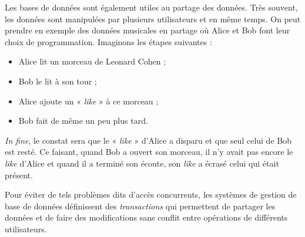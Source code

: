 Les bases de données sont également utiles au partage des données. Très souvent, les données sont manipulées par plusieurs utilisateurs et en même temps. On peut prendre en exemple des données musicales en partage où Alice et Bob font leur choix de programmation. Imaginons les étapes suivantes :
\begin{itemize}
	\item Alice lit un morceau de Leonard Cohen ;
	\item Bob le lit à son tour ;
	\item Alice ajoute un « \textit{like} » à ce morceau ;
	\item  Bob fait de même un peu plus tard.
\end{itemize}
\textit{In fine}, le constat sera que le « \textit{like} » d'Alice a disparu et que seul celui de Bob est resté. Ce faisant, quand Bob a ouvert son morceau, il n'y avait pas encore le \textit{like} d'Alice et quand il a terminé son écoute, son \textit{like} a écrasé celui qui était présent.

Pour éviter de tels problèmes dits d'accès concurrents, les systèmes de gestion de base de données définissent des \emph{transactions} qui permettent de partager les données et de faire des modifications sans conflit entre opérations de différents utilisateurs.

